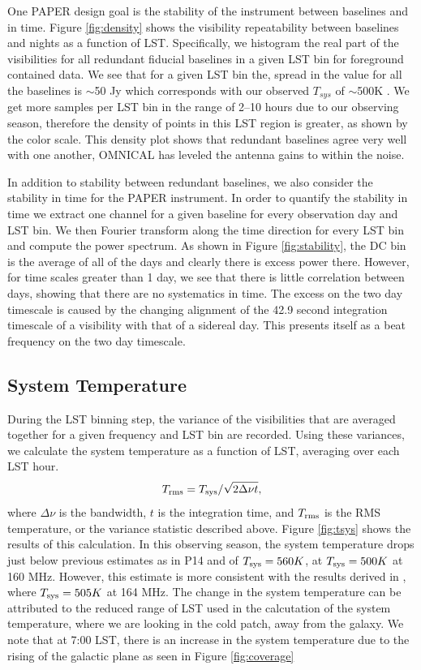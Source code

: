 \documentclass[twocolumn,numberedappendix]{emulateapj} \shorttitle{PSA64}
\newcommand{\Tsys}{T_{\rm sys}}
\begin{document}
One PAPER design goal is the stability of the instrument between
baselines and in time. Figure \ref{fig:density} shows the visibility repeatability between 
baselines and nights as a function of LST. Specifically, we histogram the real part of
the visibilities for all redundant fiducial baselines 
in a given LST bin for foreground contained data. We see that for a
given LST bin the, spread in the value for all the baselines is $\sim$50 Jy which corresponds with our observed
$T_{sys}$ of $\sim$500K .  We get
more samples per LST bin in the range of 2--10 hours due to our observing
season, therefore the density of points in this LST region is greater, as shown by
the color scale. This density plot shows that redundant baselines agree very well
with one another, OMNICAL has leveled the antenna gains to within the noise.

In addition to stability between redundant baselines, we also consider the
stability in time for the PAPER instrument. In order to quantify the stability
in time we extract one channel for a given baseline for every observation day
and LST bin. We then Fourier transform along the time direction for every LST
bin and compute the power spectrum. As shown in Figure \ref{fig:stability}, the
DC bin is the average of all of the days and clearly there is excess power
there. However, for time scales greater than 1 day, we see that there is little
correlation between days, showing that there are no systematics in time. The
excess on the two day timescale is caused by the changing alignment of the 42.9
second integration timescale of a visibility with that of a sidereal day. This
presents itself as a beat frequency on the two day timescale.

\subsection{System Temperature}   

During the LST binning step, the variance of the visibilities that are averaged
together for a given frequency and LST bin are recorded. Using these variances,
we calculate the system temperature as a function of LST, averaging over each
LST hour. 
\begin{equation}
    T_{\rm rms} = \Tsys/\sqrt{2\Delta\nu t}, 
\end{equation}
where $\Delta\nu$ is the bandwidth, $t$ is the integration time, and
$T_{\rm rms}$ is the RMS temperature, or the variance statistic described above.
Figure \ref{fig:tsys} shows the results of this calculation. In this observing
season, the system temperature drops just below previous estimates 
as in P14 and \citet{jacobs_et_al2014} of $\Tsys=560K$, at $\Tsys=500K$ at 160
MHz. However, this estimate is more consistent with the results derived in
\citep{moore_et_al2015}, where $\Tsys=505K$ at 164 MHz. The change in the
system temperature can be attributed to the reduced range of LST used in the
calcutation of the system temperature, where we are looking in the cold patch, away from the galaxy. We note that at 7:00 LST, there is an increase in the system temperature due to the rising of the galactic plane as seen in Figure \ref{fig:coverage}
\end{document}
